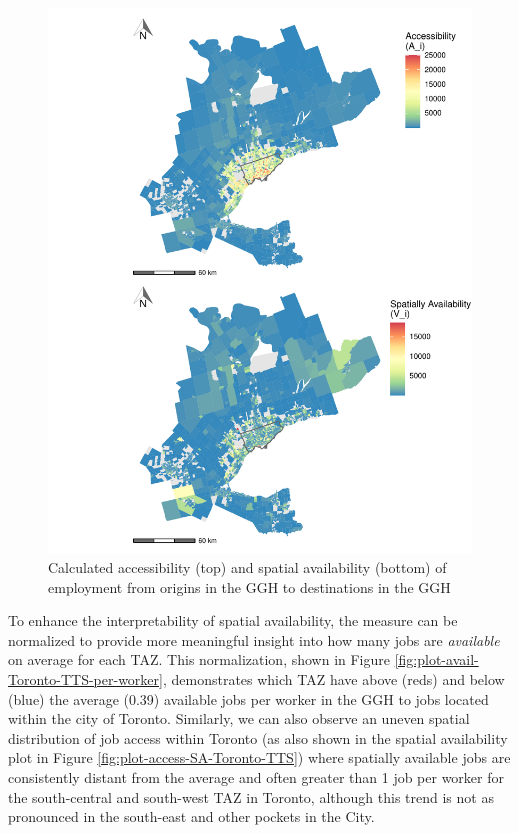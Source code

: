 \documentclass[]{elsarticle} %
\begin{document}
\begin{figure}
\includegraphics[width=1\linewidth]{Spatial-Availability_files/figure-latex/plot-access-SA-GGH-TTS-1} \caption{\label{fig:plot-access-SA-GGH-TTS}Calculated accessibility (top) and spatial availability (bottom) of employment from origins in the GGH to destinations in the GGH}\label{fig:plot-access-SA-GGH-TTS}
\end{figure}

\newpage

To enhance the interpretability of spatial availability, the measure can
be normalized to provide more meaningful insight into how many jobs are
\emph{available} on average for each TAZ. This normalization, shown in
Figure \ref{fig:plot-avail-Toronto-TTS-per-worker}, demonstrates which
TAZ have above (reds) and below (blue) the average (0.39) available jobs
per worker in the GGH to jobs located within the city of Toronto.
Similarly, we can also observe an uneven spatial distribution of job
access within Toronto (as also shown in the spatial availability plot in
Figure \ref{fig:plot-access-SA-Toronto-TTS}) where spatially available
jobs are consistently distant from the average and often greater than 1
job per worker for the south-central and south-west TAZ in Toronto,
although this trend is not as pronounced in the south-east and other
pockets in the City.
\end{document}
